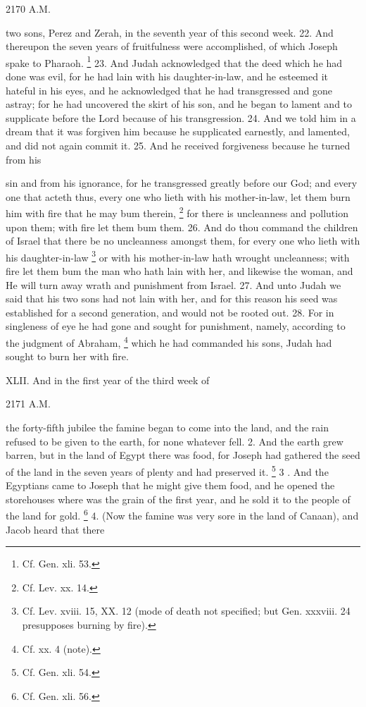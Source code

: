 2170 A.M.

two sons, Perez and Zerah, in the seventh year of this second week. 22. And thereupon the seven years of fruitfulness were accomplished, of which Joseph spake to Pharaoh. \footnote{Cf. Gen. xli. 53.} 23. And Judah acknowledged that the deed which he had done was evil, for he had lain with his daughter-in-law, and he esteemed it hateful in his eyes, and he acknowledged that he had transgressed and gone astray; for he had uncovered the skirt of his son, and he began to lament and to supplicate before the Lord because of his transgression. 24. And we told him in a dream that it was forgiven him because he supplicated earnestly, and lamented, and did not again commit it. 25. And he received forgiveness because he turned from his

sin and from his ignorance, for he transgressed greatly before our God; and every one that acteth thus, every one who lieth with his mother-in-law, let them burn him with fire that he may bum therein, \footnote{Cf. Lev. xx. 14.} for there is uncleanness and pollution upon them; with fire let them bum them. 26. And do thou command the children of Israel that there be no uncleanness amongst them, for every one who lieth with his daughter-in-law \footnote{Cf. Lev. xviii. 15, XX. 12 (mode of death not specified; but Gen. xxxviii. 24 presupposes burning by fire).} or with his mother-in-law hath wrought uncleanness; with fire let them bum the man who hath lain with her, and likewise the woman, and He will turn away wrath and punishment from Israel. 27. And unto Judah we said that his two sons had not lain with her, and for this reason his seed was established for a second generation, and would not be rooted out. 28. For in singleness of eye he had gone and sought for punishment, namely, according to the judgment of Abraham, \footnote{Cf. xx. 4 (note).} which he had commanded his sons, Judah had sought to burn her with fire.


XLII. And in the first year of the third week of

2171 A.M.

the forty-fifth jubilee the famine began to come into the land, and the rain refused to be given to the earth, for none whatever fell. 2. And the earth grew barren, but in the land of Egypt there was food, for Joseph had gathered the seed of the land in the seven years of plenty and had preserved it. \footnote{Cf. Gen. xli. 54.} 3 . And the Egyptians came to Joseph that he might give them food, and he opened the storehouses where was the grain of the first year, and he sold it to the people of the land for gold. \footnote{Cf. Gen. xli. 56.} 4. (Now the famine was very sore in the land of Canaan), and Jacob heard that there

